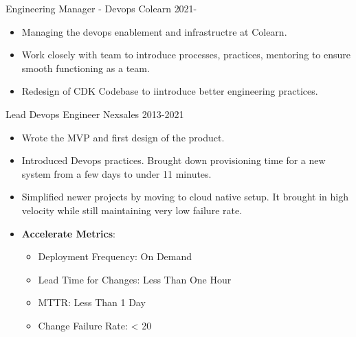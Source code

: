 \documentclass[11pt]{spidercv}
\begin{document}
    





    \begin{MainPart}

    \Experience
        {\ColorHighlight}
		{Engineering Manager - Devops}
		{Colearn}
        {2021-\faUndo}
        {   
            \begin{itemize}
            	\item[\ding{51}] Managing the devops enablement and infrastructre at Colearn.\\
            	\item[\ding{51}] Work closely with team to introduce processes, practices, mentoring to ensure smooth functioning as a team. \\
 	           \item[\ding{51}] Redesign of CDK Codebase to iintroduce better engineering practices.
            \end{itemize}        
        }
    \Experience
        {\ColorHighlight}
		{Lead Devops Engineer}
		{Nexsales}
        {2013-2021}
        {  
        	\begin{itemize}
        		\item[\ding{51}]Wrote the MVP and first design of the product.\\ 
            	\item[\ding{51}]Introduced Devops practices. Brought down provisioning time for a new system from a few days to under 11 minutes. \\
            	\item[\ding{51}]Simplified newer projects by moving to cloud native setup. It brought in high velocity while still maintaining very low failure rate.\\
            	\item[\ding{51}]\textbf{Accelerate Metrics}: \\
            		\begin{itemize}
	            		\item Deployment Frequency: On Demand \\
            			\item Lead Time for Changes: Less Than One Hour \\
            		    \item MTTR: Less Than 1 Day \\
            			\item Change Failure Rate: < 20%
            		\end{itemize}
            \end{itemize}
        }


\end{MainPart}
\end{document}
